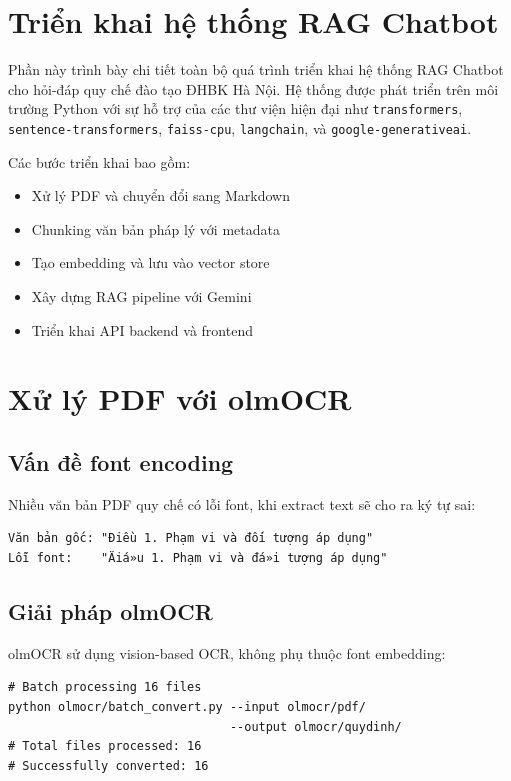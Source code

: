 \documentclass[../DoAn.tex]{subfiles}
\begin{document}
\section{Triển khai hệ thống RAG Chatbot}

Phần này trình bày chi tiết toàn bộ quá trình triển khai hệ thống RAG Chatbot cho hỏi-đáp quy chế đào tạo ĐHBK Hà Nội. Hệ thống được phát triển trên môi trường Python với sự hỗ trợ của các thư viện hiện đại như \texttt{transformers}, \texttt{sentence-transformers}, \texttt{faiss-cpu}, \texttt{langchain}, và \texttt{google-generativeai}.

Các bước triển khai bao gồm:
\begin{itemize}
    \item Xử lý PDF và chuyển đổi sang Markdown
    \item Chunking văn bản pháp lý với metadata
    \item Tạo embedding và lưu vào vector store
    \item Xây dựng RAG pipeline với Gemini
    \item Triển khai API backend và frontend
\end{itemize}

\section{Xử lý PDF với olmOCR}

\subsection{Vấn đề font encoding}
Nhiều văn bản PDF quy chế có lỗi font, khi extract text sẽ cho ra ký tự sai:

\begin{verbatim}
Văn bản gốc: "Điều 1. Phạm vi và đối tượng áp dụng"
Lỗi font:    "Äiá»u 1. Phạm vi và đá»i tượng áp dụng"
\end{verbatim}

\subsection{Giải pháp olmOCR}
olmOCR sử dụng vision-based OCR, không phụ thuộc font embedding:

\begin{verbatim}
# Batch processing 16 files
python olmocr/batch_convert.py --input olmocr/pdf/ 
                               --output olmocr/quydinh/
# Total files processed: 16
# Successfully converted: 16
\end{verbatim}
\end{document}
